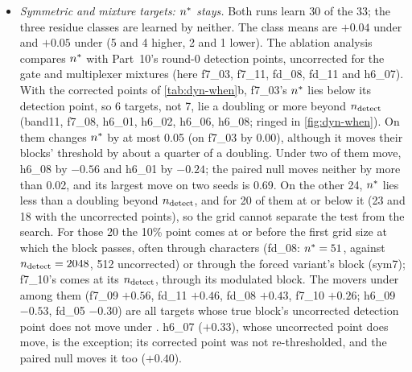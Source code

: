 \begin{itemize}
\item \emph{Symmetric and mixture targets: $n^{*}$ stays.} Both runs learn 30 of the 33; the three residue classes are learned by neither. The class means are $+0.04$ under  and $+0.05$ under  (5 and 4 higher, 2 and 1 lower). The ablation analysis compares $n^{*}$ with Part~10's round-0 detection points, uncorrected for the gate and multiplexer mixtures (here f7\_03, f7\_11, fd\_08, fd\_11 and h6\_07). With the corrected points of \cref{tab:dyn-when}b, f7\_03's $n^{*}$ lies below its detection point, so 6 targets, not 7, lie a doubling or more beyond $n_{\rm detect}$ (band11, f7\_08, h6\_01, h6\_02, h6\_06, h6\_08; ringed in \cref{fig:dyn-when}). On them  changes $n^{*}$ by at most 0.05 (on f7\_03 by 0.00), although it moves their blocks' threshold by about a quarter of a doubling. Under  two of them move, h6\_08 by $-0.56$ and h6\_01 by $-0.24$; the paired null moves neither by more than 0.02, and its largest move on two seeds is 0.69. On the other 24, $n^{*}$ lies less than a doubling beyond $n_{\rm detect}$, and for 20 of them at or below it (23 and 18 with the uncorrected points), so the grid cannot separate the test from the search. For those 20 the 10\% point comes at or before the first grid size at which the block passes, often through characters (fd\_08: $n^{*}=51$, against $n_{\rm detect}=2048$, 512 uncorrected) or through the forced variant's block (sym7); f7\_10's comes at its $n_{\rm detect}$, through its modulated block. The movers under  among them (f7\_09 $+0.56$, fd\_11 $+0.46$, fd\_08 $+0.43$, f7\_10 $+0.26$; h6\_09 $-0.53$, fd\_05 $-0.30$) are all targets whose true block's uncorrected detection point does not move under . h6\_07 ($+0.33$), whose uncorrected point does move, is the exception; its corrected point was not re-thresholded, and the paired null moves it too ($+0.40$).
\end{itemize}

